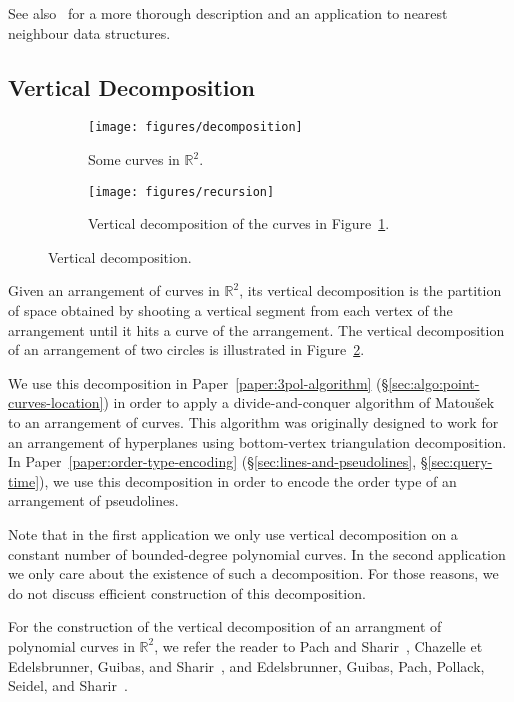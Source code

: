 See also~\cite{Cla88} for a more thorough description and an application to
nearest neighbour data structures.

\subsection{Vertical Decomposition}%
\label{sec:arrangements:vertical-decomposition}

\begin{figure}
	\centering{}
    \begin{subfigure}[t]{0.5\textwidth}
		\centering
		\texttt{[image: figures/decomposition]}
		\caption{Some curves in $\mathbb{R}^2$.}%
		\label{fig:some-curves-in-R2}
    \end{subfigure}%
    \begin{subfigure}[t]{0.5\textwidth}
		\centering
		\texttt{[image: figures/recursion]}
		\caption{Vertical decomposition of the curves in Figure~\ref{fig:some-curves-in-R2}.}%
    \end{subfigure}
	\caption{Vertical decomposition.}\label{fig:vd}
\end{figure}

Given an arrangement of curves in \(\mathbb{R}^2\), its vertical decomposition
is the partition of space obtained by shooting a vertical segment from each
vertex of the arrangement until it hits a curve of the arrangement. The
vertical decomposition of an arrangement of two circles is illustrated
in Figure~\ref{fig:vd}.

We use this decomposition in Paper~\ref{paper:3pol-algorithm}
(\S\ref{sec:algo:point-curves-location}) in order to apply a divide-and-conquer
algorithm of Matou{\v s}ek~\cite{Ma93} to an arrangement of curves.
This algorithm was originally designed to work for an arrangement of
hyperplanes using bottom-vertex triangulation decomposition.
%
In Paper~\ref{paper:order-type-encoding} (\S\ref{sec:lines-and-pseudolines},
\S\ref{sec:query-time}), we use this decomposition in order to
encode the order type of an arrangement of pseudolines.

Note that in the first application we only use vertical decomposition on a
constant number of bounded-degree polynomial curves.
%
In the second application we only care about the existence of such a
decomposition.
%
For those reasons, we do not discuss efficient construction of this
decomposition.

For the construction of the vertical decomposition of an arrangment of
polynomial curves in \(\mathbb{R}^2\),
we refer the reader to Pach and Sharir~\cite{Alcala}, Chazelle et
Edelsbrunner, Guibas, and Sharir~\cite{CEGS91},
and Edelsbrunner, Guibas, Pach, Pollack, Seidel, and
Sharir~\cite{EGPPSS92}.

